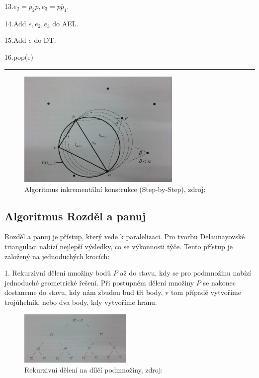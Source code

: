 \documentclass[12pt,a4paper]{article}
\begin{document}
13.\indent \indent $e_2=\overline{p_2p}, e_3=\overline{pp_1}$.

14.\indent \indent Add $e, e_2, e_3$ do AEL.

15.\indent \indent Add $e$ do DT.

16.\indent pop(e)
\newline
\hrule

\newpage
\begin{figure}[h!]
\centering
\includegraphics[width=0.7\textwidth, angle=90]{img/stepbystep.jpg}
\caption{Algoritmus inkrementální konstrukce (Step-by-Step), zdroj: \cite{triangulation}}
\label{fig:stepbystep}
\end{figure}

\newpage
\subsection{Algoritmus Rozděl a panuj}

Rozděl a panuj je přístup, který vede k paralelizaci. Pro tvorbu Delaunayovské triangulaci nabízí nejlepší výsledky, co se výkonnosti týče. Tento přístup je založený na jednoduchých krocích:

1. Rekurzivní dělení množiny bodů $P$ až do stavu, kdy se pro podmnožinu nabízí jednoduché geometrické řešení. Při postupném dělení množiny $P$ se nakonec dostaneme do stavu, kdy nám zbudou buď tři body, v tom případě vytvoříme trojúhelník, nebo dva body, kdy vytvoříme hranu.
\begin{figure}[h!]
\centering
\includegraphics[width=0.48\textwidth, angle=90]{img/div_n_conq.jpg}
\caption{Rekurzivní dělení na dílčí podmnožiny, zdroj: \cite{triangulation}}
\label{fig:div_n_conq}
\end{figure}
\end{document}
